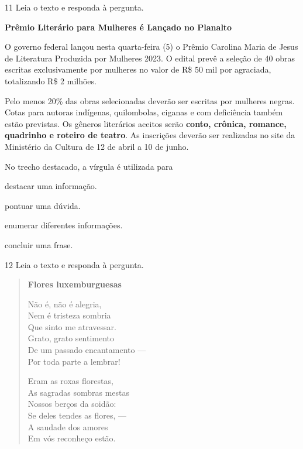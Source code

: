 \pagebreak
\num{11} Leia o texto e responda à pergunta.

\begin{myquote}
\textbf{Prêmio Literário para Mulheres é Lançado no Planalto}

O governo federal lançou nesta quarta-feira (5) o Prêmio Carolina Maria
de Jesus de Literatura Produzida por Mulheres 2023. O edital prevê a
seleção de 40 obras escritas exclusivamente por mulheres no valor de R\$
50 mil por agraciada, totalizando R\$ 2 milhões.

Pelo menos 20\% das obras selecionadas deverão ser escritas por mulheres
negras. Cotas para autoras indígenas, quilombolas, ciganas e com
deficiência também estão previstas. Os gêneros literários aceitos serão
\textbf{conto, crônica, romance, quadrinho e roteiro de teatro}. As
inscrições deverão ser realizadas no site da Ministério da Cultura de 12
de abril a 10 de junho.

\end{myquote}

No trecho destacado, a vírgula é utilizada para

\begin{escolha}
  \item destacar uma informação.

  \item pontuar uma dúvida.

  \item enumerar diferentes informações.

  \item concluir uma frase.
\end{escolha}

\num{12} Leia o texto e responda à pergunta.

\begin{myquote}
\begin{verse}
\textbf{Flores luxemburguesas}

Não é, não é alegria,\\
Nem é tristeza sombria\\
Que sinto me atravessar.\\
Grato, grato sentimento\\
De um passado encantamento ---\\
Por toda parte a lembrar!

Eram as roxas florestas,\\
As sagradas sombras mestas\\
Nossos berços da soidão:\\
Se deles tendes as flores, ---\\
A saudade dos amores\\
Em vós reconheço estão.
\end{verse}

\end{myquote}


